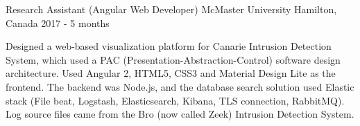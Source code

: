 \begin{cventries}
  \cventry
{Research Assistant (Angular Web Developer)} %
{McMaster University} %
{Hamilton, Canada} %
{2017 - 5 months} %
{\vspace{1.0mm}
	\begin{cvitems}
		\item
		{Designed a web-based visualization platform for Canarie Intrusion Detection System, which used a PAC (Presentation-Abstraction-Control) software design architecture. Used Angular 2, HTML5, CSS3 and Material Design Lite as the frontend. The backend was Node.js, and the database search solution used Elastic stack (File beat, Logstash, Elasticsearch, Kibana, TLS connection, RabbitMQ). Log source files came from the Bro (now called Zeek) Intrusion Detection System.}
	\end{cvitems}
}


\end{cventries}
